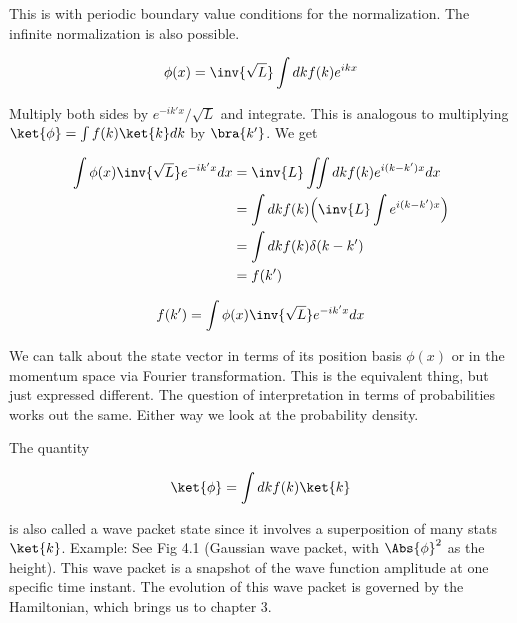 This is with periodic boundary value conditions for the normalization.  The infinite normalization is also possible.

\begin{equation}\label{eqn:lecture5BigReviewCh2Operators:120}
\phi(x)
= \inv{\sqrt{L}} \int dk f(k) e^{ikx}
\end{equation}

Multiply both sides by \(e^{-ik'x}/\sqrt{L}\) and integrate.  This is analogous to multiplying \(\ket{\phi} = \int f(k) \ket{k} dk\) by \(\bra{k'}\).  We get

\begin{equation}\label{eqn:lecture5BigReviewCh2Operators:140}
\begin{aligned}
\int \phi(x) \inv{\sqrt{L}} e^{-ik'x} dx
&= \inv{L} \iint dk f(k) e^{i(k-k')x} dx \\
&= \int dk f(k) \Bigl( \inv{L} \int e^{i(k-k')x} \Bigr) \\
&= \int dk f(k) \delta(k-k') \\
&= f(k')
\end{aligned}
\end{equation}

\begin{equation}\label{eqn:lecture5BigReviewCh2Operators:160}
f(k') = \int \phi(x) \inv{\sqrt{L}} e^{-ik'x} dx
\end{equation}

We can talk about the state vector in terms of its position basis \(\phi(x)\) or in the momentum space via Fourier transformation.  This is the equivalent thing, but just expressed different.  The question of interpretation in terms of probabilities works out the same.  Either way we look at the probability density.

The quantity

\begin{equation}\label{eqn:lecture5BigReviewCh2Operators:180}
\ket{\phi} = \int dk f(k) \ket{k}
\end{equation}

is also called a wave packet state since it involves a superposition of many stats \(\ket{k}\).  Example: See Fig 4.1 (Gaussian wave packet, with \(\Abs{\phi}^2\) as the height).  This wave packet is a snapshot of the wave function amplitude at one specific time instant.  The evolution of this wave packet is governed by the Hamiltonian, which brings us to chapter 3.

